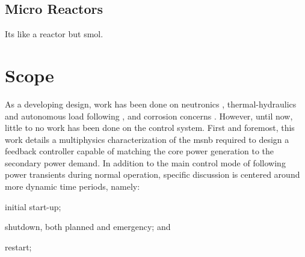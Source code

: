 \subsection{Micro Reactors}
Its like a reactor but smol.

\section{Scope}
As a developing design, work has been done on neutronics \cite{PetersonMS}, thermal-hydraulics and autonomous load following \cite{CarterPHD}, and corrosion concerns \cite{RoperPHD}. However, until now, little to no work has been done on the control system. First and foremost, this work details a multiphysics characterization of the \acs{msnb} required to design a feedback controller capable of matching the core power generation to the secondary power demand. In addition to the main control mode of following power transients during normal operation, specific discussion is centered around more dynamic time periods, namely: 
\begin{enumerate*}[label=\arabic*)]
    \item initial start-up;
    \item shutdown, both planned and emergency; and
    \item restart;
\end{enumerate*}